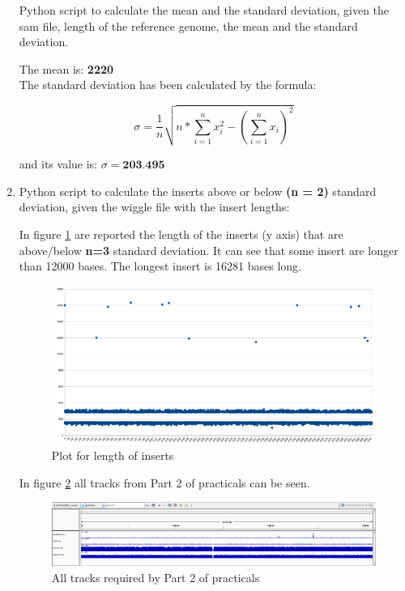 \begin{enumerate}
Python script to calculate the mean and the standard deviation, given the sam file,
length of the reference genome, the mean and the standard deviation.


The mean is: \textbf{2220} \\

The standard deviation has been calculated by the formula: 

\begin{equation}
\sigma = \frac{1}{n}\sqrt{n*\sum_{i=1}^{n} x_i^2 - (\sum_{i=1}^{n} x_i)^2}
\end{equation}

and its value is: $\sigma = \textbf{203.495}$

  \item Python script to calculate the inserts above or below \textbf{(n = 2)} standard
deviation, given the wiggle file with the insert lengths:


In figure \ref{img:plot} are reported the length of the inserts (y axis) that are above/below
\textbf{n=3} standard deviation.
It can see that some insert are longer than 12000 bases.
The longest insert is 16281 bases long. \\

\begin{figure}[h]
  \centering
  \includegraphics[scale=0.2]{img/plot}
  \caption{Plot for length of inserts}
  \label{img:plot}
\end{figure}

In figure \ref{img:all_tracks} all tracks from Part 2 of practicals can be seen. \\

\begin{figure}[h]
  \centering
  \includegraphics[scale=0.2]{img/all_tracks}
  \caption{All tracks required by Part 2 of practicals}
  \label{img:all_tracks}
\end{figure}


\end{enumerate}
